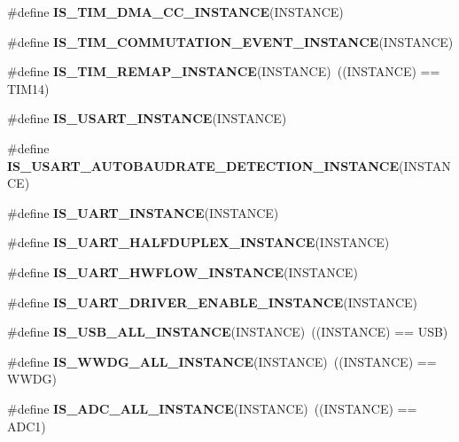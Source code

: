 \begin{DoxyCompactItemize}
\#define {\bfseries I\+S\+\_\+\+T\+I\+M\+\_\+\+D\+M\+A\+\_\+\+C\+C\+\_\+\+I\+N\+S\+T\+A\+N\+CE}(I\+N\+S\+T\+A\+N\+CE)
\item 
\#define {\bfseries I\+S\+\_\+\+T\+I\+M\+\_\+\+C\+O\+M\+M\+U\+T\+A\+T\+I\+O\+N\+\_\+\+E\+V\+E\+N\+T\+\_\+\+I\+N\+S\+T\+A\+N\+CE}(I\+N\+S\+T\+A\+N\+CE)
\item 
\mbox{\label{group___exported__macro_ga6bb03cf116b07bfe1bd527f8ab61a7f9}} 
\#define {\bfseries I\+S\+\_\+\+T\+I\+M\+\_\+\+R\+E\+M\+A\+P\+\_\+\+I\+N\+S\+T\+A\+N\+CE}(I\+N\+S\+T\+A\+N\+CE)~((I\+N\+S\+T\+A\+N\+CE) == T\+I\+M14)
\item 
\#define {\bfseries I\+S\+\_\+\+U\+S\+A\+R\+T\+\_\+\+I\+N\+S\+T\+A\+N\+CE}(I\+N\+S\+T\+A\+N\+CE)
\item 
\#define {\bfseries I\+S\+\_\+\+U\+S\+A\+R\+T\+\_\+\+A\+U\+T\+O\+B\+A\+U\+D\+R\+A\+T\+E\+\_\+\+D\+E\+T\+E\+C\+T\+I\+O\+N\+\_\+\+I\+N\+S\+T\+A\+N\+CE}(I\+N\+S\+T\+A\+N\+CE)
\item 
\#define {\bfseries I\+S\+\_\+\+U\+A\+R\+T\+\_\+\+I\+N\+S\+T\+A\+N\+CE}(I\+N\+S\+T\+A\+N\+CE)
\item 
\#define {\bfseries I\+S\+\_\+\+U\+A\+R\+T\+\_\+\+H\+A\+L\+F\+D\+U\+P\+L\+E\+X\+\_\+\+I\+N\+S\+T\+A\+N\+CE}(I\+N\+S\+T\+A\+N\+CE)
\item 
\#define {\bfseries I\+S\+\_\+\+U\+A\+R\+T\+\_\+\+H\+W\+F\+L\+O\+W\+\_\+\+I\+N\+S\+T\+A\+N\+CE}(I\+N\+S\+T\+A\+N\+CE)
\item 
\#define {\bfseries I\+S\+\_\+\+U\+A\+R\+T\+\_\+\+D\+R\+I\+V\+E\+R\+\_\+\+E\+N\+A\+B\+L\+E\+\_\+\+I\+N\+S\+T\+A\+N\+CE}(I\+N\+S\+T\+A\+N\+CE)
\item 
\mbox{\label{group___exported__macro_ga763f287042e73e61b91e12bb065777cd}} 
\#define {\bfseries I\+S\+\_\+\+U\+S\+B\+\_\+\+A\+L\+L\+\_\+\+I\+N\+S\+T\+A\+N\+CE}(I\+N\+S\+T\+A\+N\+CE)~((I\+N\+S\+T\+A\+N\+CE) == U\+SB)
\item 
\mbox{\label{group___exported__macro_gac2a8aaec233e19987232455643a04d6f}} 
\#define {\bfseries I\+S\+\_\+\+W\+W\+D\+G\+\_\+\+A\+L\+L\+\_\+\+I\+N\+S\+T\+A\+N\+CE}(I\+N\+S\+T\+A\+N\+CE)~((I\+N\+S\+T\+A\+N\+CE) == W\+W\+DG)
\item 
\mbox{\label{group___exported__macro_ga2204b62b378bcf08b3b9006c184c7c23}} 
\#define {\bfseries I\+S\+\_\+\+A\+D\+C\+\_\+\+A\+L\+L\+\_\+\+I\+N\+S\+T\+A\+N\+CE}(I\+N\+S\+T\+A\+N\+CE)~((I\+N\+S\+T\+A\+N\+CE) == A\+D\+C1)

\end{DoxyCompactItemize}
